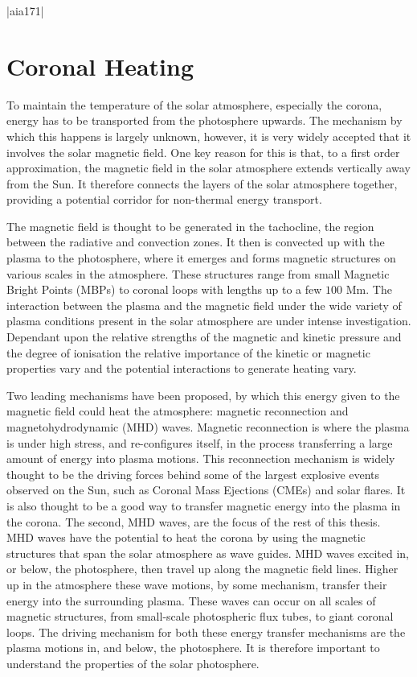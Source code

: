 \py[chapter1]|aia171|


\section{Coronal Heating}

To maintain the temperature of the solar atmosphere, especially the corona, energy has to be transported from the photosphere upwards.
The mechanism by which this happens is largely unknown, however, it is very widely accepted that it involves the solar magnetic field.
One key reason for this is that, to a first order approximation, the magnetic field in the solar atmosphere extends vertically away from the Sun.
It therefore connects the layers of the solar atmosphere together, providing a potential corridor for non-thermal energy transport.

The magnetic field is thought to be generated in the tachocline, the region between the radiative and convection zones.
It then is convected up with the plasma to the photosphere, where it emerges and forms magnetic structures on various scales in the atmosphere.
These structures range from small Magnetic Bright Points (MBPs) to coronal loops with lengths up to a few $100$ Mm.
The interaction between the plasma and the magnetic field under the wide variety of plasma conditions present in the solar atmosphere are under intense investigation.
Dependant upon the relative strengths of the magnetic and kinetic pressure and the degree of ionisation the relative importance of the kinetic or magnetic properties vary and the potential interactions to generate heating vary.

Two leading mechanisms have been proposed, by which this energy given to the magnetic field could heat the atmosphere: magnetic reconnection and magnetohydrodynamic (MHD) waves.
Magnetic reconnection is where the plasma is under high stress, and re-configures itself, in the process transferring a large amount of energy into plasma motions.
This reconnection mechanism is widely thought to be the driving forces behind some of the largest explosive events observed on the Sun, such as Coronal Mass Ejections (CMEs) and solar flares.
It is also thought to be a good way to transfer magnetic energy into the plasma in the corona.
The second, MHD waves, are the focus of the rest of this thesis.
MHD waves have the potential to heat the corona by using the magnetic structures that span the solar atmosphere as wave guides.
MHD waves excited in, or below, the photosphere, then travel up along the magnetic field lines.
Higher up in the atmosphere these wave motions, by some mechanism, transfer their energy into the surrounding plasma.
These waves can occur on all scales of magnetic structures, from small-scale photospheric flux tubes, to giant coronal loops.
The driving mechanism for both these energy transfer mechanisms are the plasma motions in, and below, the photosphere.
It is therefore important to understand the properties of the solar photosphere.

